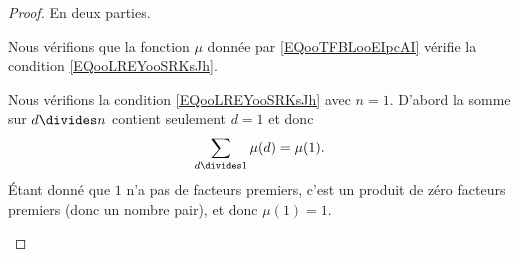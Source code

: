 \begin{proof}
	En deux parties.
	\begin{subproof}
		\spitem[Existence]
		Nous vérifions que la fonction \( \mu\) donnée par \eqref{EQooTFBLooEIpcAI} vérifie la condition \eqref{EQooLREYooSRKsJh}.
		\begin{subproof}
			\spitem[Pour \( n=1\)]
			Nous vérifions la condition \eqref{EQooLREYooSRKsJh} avec \( n=1\). D'abord la somme sur \( d\divides n\) contient seulement \( d=1\) et donc
			\begin{equation}
				\sum_{d\divides 1}\mu(d)=\mu(1).
			\end{equation}
			Étant donné que \( 1\) n'a pas de facteurs premiers, c'est un produit de zéro facteurs premiers (donc un nombre pair), et donc \( \mu(1)=1\).


\end{subproof}
\end{subproof}
\end{proof}
